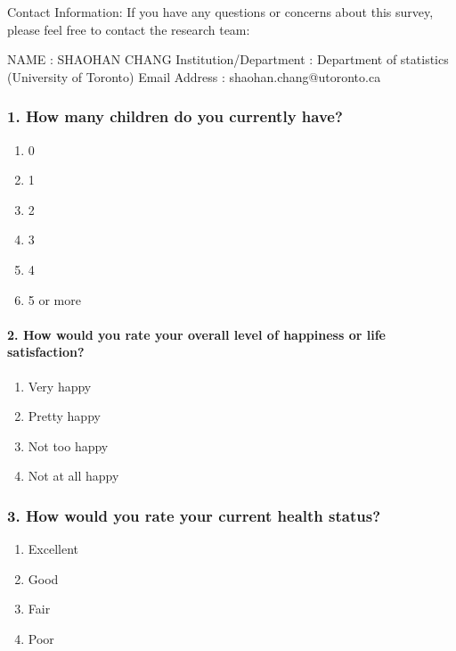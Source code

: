 \documentclass[
  letterpaper,
  DIV=11,
  numbers=noendperiod]{scrartcl}
\let\oldparagraph\paragraph
\renewcommand{\paragraph}[1]{\oldparagraph{#1}\mbox{}}
\providecommand{\tightlist}{%
  \setlength{\itemsep}{0pt}\setlength{\parskip}{0pt}}\usepackage{longtable,booktabs,array}
\begin{document}
Contact Information: If you have any questions or concerns about this
survey, please feel free to contact the research team:

NAME : SHAOHAN CHANG Institution/Department : Department of statistics
(University of Toronto) Email Address : shaohan.chang@utoronto.ca

\hypertarget{how-many-children-do-you-currently-have}{%
\subsubsection{1. How many children do you currently
have?}\label{how-many-children-do-you-currently-have}}

\begin{enumerate}
\def\labelenumi{\alph{enumi}.}
\tightlist
\item
  0
\item
  1
\item
  2
\item
  3
\item
  4
\item
  5 or more
\end{enumerate}

\hypertarget{how-would-you-rate-your-overall-level-of-happiness-or-life-satisfaction}{%
\paragraph{2. How would you rate your overall level of happiness or life
satisfaction?}\label{how-would-you-rate-your-overall-level-of-happiness-or-life-satisfaction}}

\begin{enumerate}
\def\labelenumi{\alph{enumi}.}
\tightlist
\item
  Very happy
\item
  Pretty happy
\item
  Not too happy
\item
  Not at all happy
\end{enumerate}

\hypertarget{how-would-you-rate-your-current-health-status}{%
\subsubsection{3. How would you rate your current health
status?}\label{how-would-you-rate-your-current-health-status}}

\begin{enumerate}
\def\labelenumi{\alph{enumi}.}
\tightlist
\item
  Excellent
\item
  Good
\item
  Fair
\item
  Poor
\end{enumerate}
\end{document}
